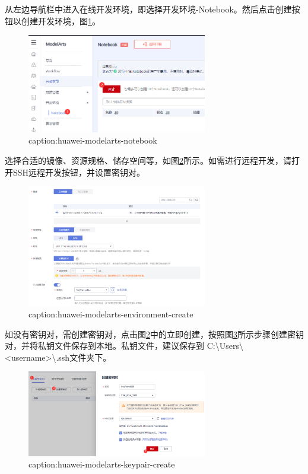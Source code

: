 从左边导航栏中进入在线开发环境，即选择开发环境-Notebook。然后点击创建按钮以创建开发环境，图\ref{fig:huawei-modelarts-notebook}。

\begin{figure}[htbp]
	\centering
	\includegraphics[width=0.7\textwidth]{figures/huawei-modelarts-notebook.png}
	\caption{caption:huawei-modelarts-notebook}
	\label{fig:huawei-modelarts-notebook}
\end{figure}


选择合适的镜像、资源规格、储存空间等，如图\ref{fig:huawei-modelarts-environment-create}所示。如需进行远程开发，请打开SSH远程开发按钮，并设置密钥对。

\begin{figure}[htbp]
	\centering
	\includegraphics[width=0.7\textwidth]{figures/huawei-modelarts-environment-create.png}
	\caption{caption:huawei-modelarts-environment-create}
	\label{fig:huawei-modelarts-environment-create}
\end{figure}

如没有密钥对，需创建密钥对，点击图\ref{fig:huawei-modelarts-environment-create}中的立即创建，按照图\ref{fig:huawei-modelarts-keypair-create}所示步骤创建密钥对，并将私钥文件保存到本地。私钥文件，建议保存到 C:\textbackslash Users\textbackslash <username>\textbackslash .ssh文件夹下。

\begin{figure}[htbp]
	\centering
	\includegraphics[width=0.7\textwidth]{figures/huawei-modelarts-keypair-create.png}
	\caption{caption:huawei-modelarts-keypair-create}
	\label{fig:huawei-modelarts-keypair-create}
\end{figure}

